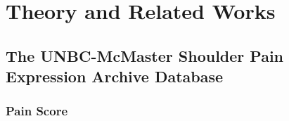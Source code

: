\documentclass[Main]{subfiles}
\begin{document}
\section{Theory and Related Works} %
	\label{sec:theory_and_related_works}

	\subsection{The UNBC-McMaster Shoulder Pain Expression Archive Database} %
		\label{sub:unbc_mcmaster}
		
		\subsubsection{Pain Score} %
			\label{ssub:pain_score}
			


\end{document}

